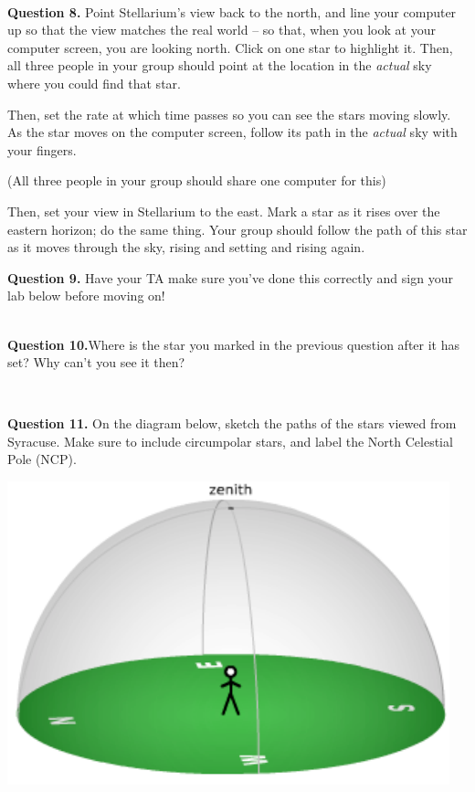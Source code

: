 \documentclass[11pt]{article}
\begin{document}
\hrulefill\\

\textbf{Question 8.} Point Stellarium's view back to the north, and line your computer up so that the view matches the real world --
so that, when you look at your computer screen, you are looking north. Click on one star to highlight it. Then, all three people
in your group should point at the location in the {\it actual} sky where you could find that star. 

Then, set the rate at which time passes so you can see the stars moving slowly. As the star moves on the computer screen, follow
its path in the {\it actual} sky with your fingers.

(All three people in your group should share one computer for this)

Then, set your view in Stellarium to the east. Mark a star as it rises over the eastern horizon; do the same thing. Your group
should follow the path of this star as it moves through the sky, rising and setting and rising again.

\textbf{Question 9.} Have your TA make sure you've done this correctly and sign your lab below before moving on!\\ \\

\hrulefill

\textbf{Question 10.}Where is the star you marked in the previous question after it has set? Why can't you see it then?
\vspace*{1.5cm}

\hrulefill\\

\newpage

\textbf{Question 11.} On the diagram below, sketch the paths of the stars viewed from Syracuse. Make sure to include circumpolar stars, and label the North Celestial Pole (NCP). \\
\vspace*{1.5cm}

\begin{center}
	\includegraphics{local_sky}
\end{center}
\end{document}
